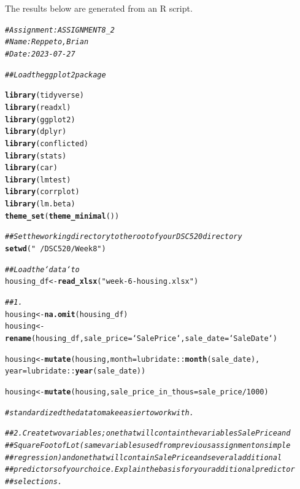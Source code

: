 \documentclass{article}\usepackage[]{graphicx}\usepackage[]{xcolor}
\makeatletter
\newcommand{\hlnum}[1]{\textcolor[rgb]{0.686,0.059,0.569}{#1}}%
\newcommand{\hlstr}[1]{\textcolor[rgb]{0.192,0.494,0.8}{#1}}%
\newcommand{\hlcom}[1]{\textcolor[rgb]{0.678,0.584,0.686}{\textit{#1}}}%
\newcommand{\hlopt}[1]{\textcolor[rgb]{0,0,0}{#1}}%
\newcommand{\hlstd}[1]{\textcolor[rgb]{0.345,0.345,0.345}{#1}}%
\newcommand{\hlkwb}[1]{\textcolor[rgb]{0.69,0.353,0.396}{#1}}%
\newcommand{\hlkwc}[1]{\textcolor[rgb]{0.333,0.667,0.333}{#1}}%
\newcommand{\hlkwd}[1]{\textcolor[rgb]{0.737,0.353,0.396}{\textbf{#1}}}%
\newenvironment{kframe}{%
 \def\at@end@of@kframe{}%
 \ifinner\ifhmode%
  \def\at@end@of@kframe{\end{minipage}}%
  \begin{minipage}{\columnwidth}%
 \fi\fi%
 \def\FrameCommand##1{\hskip\@totalleftmargin \hskip-\fboxsep
 \colorbox{shadecolor}{##1}\hskip-\fboxsep
     \hskip-\linewidth \hskip-\@totalleftmargin \hskip\columnwidth}%
 \MakeFramed {\advance\hsize-\width
   \@totalleftmargin\z@ \linewidth\hsize
   \@setminipage}}%
 {\par\unskip\endMakeFramed%
 \at@end@of@kframe}
\newenvironment{knitrout}{}{} %
\makeatother
\begin{document}
The results below are generated from an R script.

\begin{knitrout}
\color{fgcolor}\begin{kframe}
\begin{alltt}
\hlcom{# Assignment: ASSIGNMENT 8_2}
\hlcom{# Name: Reppeto, Brian}
\hlcom{# Date: 2023-07-27}

\hlcom{## Load the ggplot2 package}

\hlkwd{library}\hlstd{(tidyverse)}
\hlkwd{library}\hlstd{(readxl)}
\hlkwd{library}\hlstd{(ggplot2)}
\hlkwd{library}\hlstd{(dplyr)}
\hlkwd{library}\hlstd{(conflicted)}
\hlkwd{library}\hlstd{(stats)}
\hlkwd{library}\hlstd{(car)}
\hlkwd{library}\hlstd{(lmtest)}
\hlkwd{library}\hlstd{(corrplot)}
\hlkwd{library}\hlstd{(lm.beta)}
\hlkwd{theme_set}\hlstd{(}\hlkwd{theme_minimal}\hlstd{())}

\hlcom{## Set the working directory to the root of your DSC 520 directory}
\hlkwd{setwd}\hlstd{(}\hlstr{"~/DSC520/Week 8"}\hlstd{)}

\hlcom{## Load the `data` to}
\hlstd{housing_df} \hlkwb{<-} \hlkwd{read_xlsx}\hlstd{(}\hlstr{"week-6-housing.xlsx"}\hlstd{)}


\hlcom{## 1.}
\hlstd{housing} \hlkwb{<-} \hlkwd{na.omit}\hlstd{(housing_df)}
\hlstd{housing} \hlkwb{<-}
  \hlkwd{rename}\hlstd{(housing_df,} \hlkwc{sale_price} \hlstd{= `Sale Price`,} \hlkwc{sale_date} \hlstd{= `Sale Date`)}

\hlstd{housing} \hlkwb{<-} \hlkwd{mutate}\hlstd{(housing,} \hlkwc{month} \hlstd{= lubridate} \hlopt{::} \hlkwd{month} \hlstd{(sale_date),}
                  \hlkwc{year} \hlstd{= lubridate} \hlopt{::} \hlkwd{year} \hlstd{(sale_date))}

\hlstd{housing} \hlkwb{<-} \hlkwd{mutate}\hlstd{(housing,} \hlkwc{sale_price_in_thous} \hlstd{= sale_price} \hlopt{/} \hlnum{1000}\hlstd{)}

\hlcom{# standardized the data to make easier to work with.}

\hlcom{## 2. Create two variables; one that will contain the variables Sale Price and }
\hlcom{## Square Foot of Lot (same variables used from previous assignment on simple }
\hlcom{## regression) and one that will contain Sale Price and several additional }
\hlcom{## predictors of your choice. Explain the basis for your additional predictor }
\hlcom{## selections.}


\end{alltt}
\end{kframe}
\end{knitrout}
\end{document}
